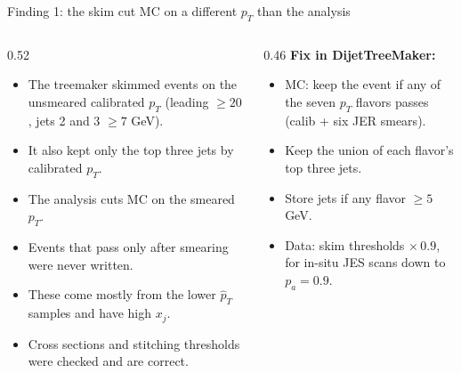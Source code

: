 \documentclass[aspectratio=169,10pt]{beamer}
\newcommand{\xj}{x_{j}}
\begin{document}
\begin{frame}{Finding 1: the skim cut MC on a different $p_T$ than the analysis}
  \begin{columns}[T]
    \begin{column}{0.52\textwidth}
      \begin{itemize}
        \item The treemaker skimmed events on the unsmeared calibrated $p_T$ (leading $\geq 20$, jets 2 and 3 $\geq 7$ GeV).
        \item It also kept only the top three jets by calibrated $p_T$.
        \item The analysis cuts MC on the smeared $p_T$.
        \item Events that pass only after smearing were never written.
        \item These come mostly from the lower $\hat p_T$ samples and have high $\xj$.
        \item Cross sections and stitching thresholds were checked and are correct.
      \end{itemize}
    \end{column}
    \begin{column}{0.46\textwidth}
      \small
      \textbf{Fix in DijetTreeMaker:}
      \begin{itemize}
        \item MC: keep the event if any of the seven $p_T$ flavors passes (calib + six JER smears).
        \item Keep the union of each flavor's top three jets.
        \item Store jets if any flavor $\geq 5$ GeV.
        \item Data: skim thresholds $\times\,0.9$, for in-situ JES scans down to $p_a = 0.9$.
      \end{itemize}
    \end{column}
  \end{columns}
\end{frame}
\end{document}
